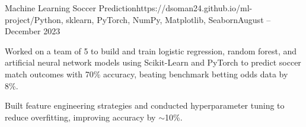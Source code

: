 \documentclass{article}
\begin{document}
\begin{flushleft}
    \begin{project}{Machine Learning Soccer Prediction}{https://dsoman24.github.io/ml-project/}{Python, sklearn, PyTorch, NumPy, Matplotlib, Seaborn}{August -- December 2023}
        \item Worked on a team of 5 to build and train logistic regression, random forest, and artificial neural network models using Scikit-Learn and PyTorch to predict soccer match outcomes with 70\% accuracy, beating benchmark betting odds data by 8\%.
        \item Built feature engineering strategies and conducted hyperparameter tuning to reduce overfitting, improving accuracy by $\sim$10\%.
    \end{project}


    \vspace{3pt}
     \\
     \\
     \\

\end{flushleft}
\end{document}
